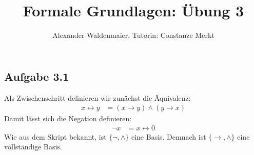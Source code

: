 \documentclass{article}
\title{Formale Grundlagen: Übung 3}
\author{Alexander Waldenmaier, Tutorin: Constanze Merkt}
\begin{document}
    \maketitle
    

    \subsection*{Aufgabe 3.1}
    Als Zwischenschritt definieren wir zunächst die Äquivalenz:
    \begin{align*}
        x \leftrightarrow y &= (x \rightarrow y) \wedge (y \rightarrow x)
    \end{align*}
    Damit lässt sich die Negation definieren:
    \begin{align*}
        \neg x &= x \leftrightarrow 0
    \end{align*}
    Wie aus dem Skript bekannt, ist $\{\neg, \wedge\}$ eine Basis. Demnach ist $\{\rightarrow, \wedge\}$ eine vollständige Basis.
\end{document}
